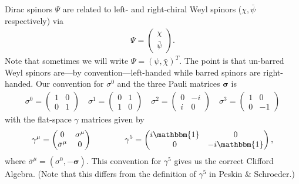 \documentclass[12pt]{article}
\numberwithin{equation}{section}    %
\renewcommand{\vec}[1]{\mathbf{#1}} %
\begin{document}
Dirac spinors $\Psi$ are related to left- and right-chiral Weyl spinors ($\chi, \bar\psi$ respectively) via
\begin{align}
	\Psi = \begin{pmatrix}
		\chi \\
		\bar\psi
	\end{pmatrix}.
\end{align}
Note that sometimes we will write $\Psi=(\psi,\bar\chi)^T$. The point is that un-barred Weyl spinors are---by convention---left-handed while barred spinors are right-handed. 
Our convention for $\sigma^0$ and the three Pauli matrices $\vec\sigma$ is
\begin{align}
	\sigma^0 = 
	\begin{pmatrix}
		1 & 0\\
		0 & 1
	\end{pmatrix}
	\quad
	\sigma^1 = 
	\begin{pmatrix}
		0 & 1\\
		1 & 0
	\end{pmatrix}
	\quad
	\sigma^2 = 
	\begin{pmatrix}
		0 & -i\\
		i & 0
	\end{pmatrix}
	\quad
	\sigma^3 = 
	\begin{pmatrix}
		1 & 0\\
		0 & -1
	\end{pmatrix}
\end{align}
with the flat-space $\gamma$ matrices given by
\begin{align}
	\gamma^\mu =
	\begin{pmatrix}
		0 & \sigma^\mu \\
		\bar\sigma^\mu & 0 
	\end{pmatrix}
	\quad\quad\quad\quad
	\gamma^5=
	\begin{pmatrix}
		i\mathbbm{1} & 0 \\
		0 & -i\mathbbm{1}
	\end{pmatrix},
\end{align}
where $\bar\sigma^\mu = (\sigma^0, -\vec\sigma)$.
This convention for $\gamma^5$ gives us the correct Clifford Algebra. (Note that this differs from the definition of $\gamma^5$ in Peskin \& Schroeder.)
\end{document}
